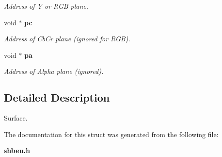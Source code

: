 \begin{DoxyCompactItemize}
\begin{DoxyCompactList}\small\item\em Address of Y or RGB plane. \item\end{DoxyCompactList}\item 
void $\ast$ {\bf pc}\label{structren__vid__surface_ae7db436aad329ac2cda96546a398d93b}

\begin{DoxyCompactList}\small\item\em Address of CbCr plane (ignored for RGB). \item\end{DoxyCompactList}\item 
void $\ast$ {\bf pa}\label{structren__vid__surface_a219cb9c0be749216075adc6a45e45bb2}

\begin{DoxyCompactList}\small\item\em Address of Alpha plane (ignored). \item\end{DoxyCompactList}\end{DoxyCompactItemize}


\subsection{Detailed Description}
Surface. 

The documentation for this struct was generated from the following file:\begin{DoxyCompactItemize}
\item 
{\bf shbeu.h}\end{DoxyCompactItemize}
